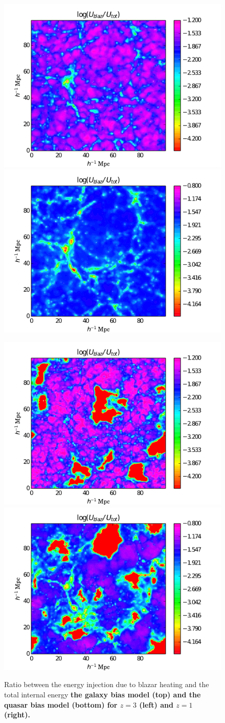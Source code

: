 \documentclass[twocolumns]{emulateapj}
\newcommand\ALc[1]{{\color{red} \bf #1}} %
\begin{document}
\begin{figure}
  \centering
  \includegraphics[width = .45\textwidth ]{data_U_z3_gal2.png}
  \includegraphics[width = .45\textwidth ]{data_U_z1_gal2.png}

  \includegraphics[width = .45\textwidth ]{data_U_z3_qso4.png}
  \includegraphics[width = .45\textwidth ]{data_U_z1_qso4.png}
   \caption{Ratio between the energy injection due to blazar heating and the total internal energy \ALc{the galaxy bias model (top) and the quasar bias model (bottom) for $z=3$ (left) and $z=1$ (right).}}
  \label{fig:heating_ratio}
\end{figure}
\end{document}
